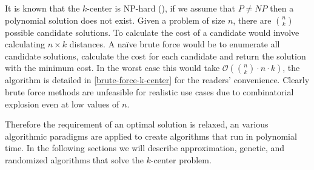 It is known that the $k$-center is NP-hard (\cite{kariv_algorithmic_1979}), if we assume that \(P \neq NP\) then a polynomial solution does not exist. Given a problem of size \(n\), there are $\binom{n}{k}$ possible candidate solutions. To calculate the cost of a candidate would involve calculating \(n\times k\) distances. A na\"ive brute force would be to enumerate all candidate solutions, calculate the cost for each candidate and return the solution with the minimum cost. In the worst case this would take $\mathcal{O}(\binom{n}{k}\cdot n\cdot k)$, the algorithm is detailed in \cref{brute-force-k-center} for the readers' convenience. Clearly brute force methods are unfeasible for realistic use cases due to combinatorial explosion even at low values of $n$. 

Therefore the requirement of an optimal solution is relaxed, an various algorithmic paradigms are applied to create algorithms that run in polynomial time. In the following sections we will describe approximation, genetic, and randomized algorithms that solve the $k$-center problem.